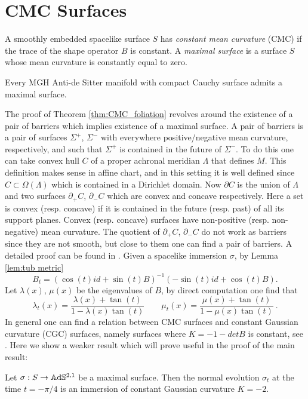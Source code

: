 \section{CMC Surfaces}
A smoothly embedded spacelike surface $S$ has \textit{constant mean curvature} (CMC) if the trace of the shape operator $B$ is constant. A \textit{maximal surface} is a surface $S$ whose mean curvature is constantly equal to zero.
\begin{theorem}\label{thm:CMC_foliation}
    Every MGH Anti-de Sitter manifold with compact Cauchy surface admits a maximal surface.
\end{theorem}
The proof of Theorem \ref{thm:CMC_foliation} revolves around the existence of a pair of barriers which implies existence of a maximal surface. A pair of barriers is a pair of surfaces $\Sigma^+$, $\Sigma^-$ with everywhere positive/negative mean curvature, respectively, and such that $\Sigma^+$ is contained in the future of $\Sigma^-$.
To do this one can take convex hull $C$ of a proper achronal meridian $\Lambda$ that defines $M$. This definition makes sense in affine chart, and in this setting it is well defined since $C \subset \Omega(\Lambda)$ which is contained in a Dirichlet domain. Now $\partial C$ is the union of $\Lambda$ and two surfaces $\partial_+ C$, $\partial_- C$ which are convex and concave respectively. Here a set is convex (resp. concave) if it is contained in the future (resp. past) of all its support planes. Convex (resp. concave) surfaces have non-positive (resp. non-negative) mean curvature. The quotient of $\partial_+ C$, $\partial_- C$ do not work as barriers since they are not smooth, but close to them one can find a pair of barriers.
A detailed proof can be found in \cite{barbot2004constant}.
Given a spacelike immersion $\sigma$, by Lemma \ref{lem:tub metric}
\[
    B_t = (\cos(t) id + \sin(t) B)^{-1}(-\sin(t) id + \cos(t) B).
\]
Let $\lambda(x)$, $\mu(x)$ be the eigenvalues of $B$, by direct computation one find that
\begin{equation} \label{eq:eigenvalues}
    \lambda_t(x) = \frac{\lambda(x)+\tan(t)}{1- \lambda(x)\tan(t)} \qquad \mu_t(x) = \frac{\mu(x)+\tan(t)}{1- \mu(x)\tan(t)} \ .
\end{equation}
In general one can find a relation between CMC surfaces and constant Gaussian curvature (CGC) surfaces, namely surfaces where $K = -1 - detB$ is constant, see \cite{chen2017constantmeancurvaturefoliation}. Here we show a weaker result which will prove useful in the proof of the main result:
\begin{proposition} \label{prop:cmc to cgc}
    Let $\sigma: S \to\mathbb{A}\mathrm{d}\mathbb{S}^{2,1}$ be a maximal surface. Then the normal evolution $\sigma_{t}$ at the time $t= -\pi / 4$ is an immersion of constant Gaussian curvature $K = -2$.
\end{proposition}
